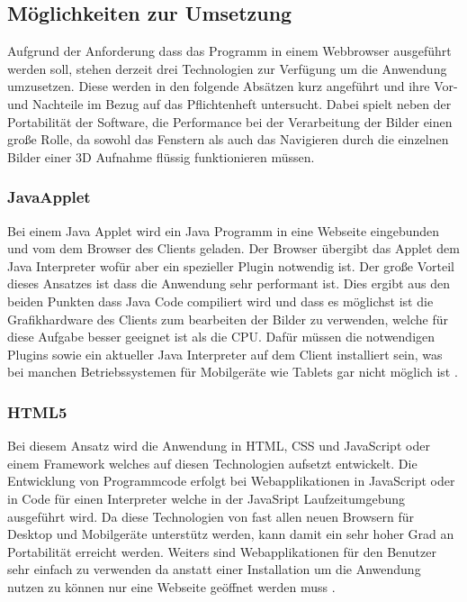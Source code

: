 \subsection{Möglichkeiten zur Umsetzung}
\label{sec:Möglichkeiten zur Umsetzung}
Aufgrund der Anforderung\R{,} dass\Rd{,} das Programm in einem Webbrowser ausgeführt werden soll, stehen derzeit drei Technologien zur Verfügung um die Anwendung umzusetzen.
Diese werden in den folgende Absätzen kurz angeführt und ihre Vor- und Nachteile im Bezug auf das Pflichtenheft untersucht.
Dabei spielt neben der Portabilität der Software, 
die Performance bei der Verarbeitung der Bilder einen große Rolle, da sowohl das Fenstern als auch das Navigieren durch die einzelnen Bilder einer 3D Aufnahme  flüssig funktionieren müssen.

\subsubsection{JavaApplet}
\label{sec:JavaApplet}
Bei einem Java Applet   wird ein Java Programm in eine Webseite eingebunden und vom dem Browser des Clients geladen.
Der Browser übergibt das Applet dem Java Interpreter wofür aber ein spezieller Plugin notwendig ist. 
%
Der große Vorteil dieses Ansatzes ist dass die Anwendung sehr performant ist.
Dies ergibt aus den beiden Punkten dass Java Code compiliert wird und dass es möglichst ist die Grafikhardware des Clients zum bearbeiten  der Bilder zu verwenden,
welche für diese Aufgabe besser geeignet ist als die CPU.
%
Dafür müssen die notwendigen Plugins sowie ein aktueller Java Interpreter auf dem Client installiert sein, 
was bei manchen Betriebssystemen für Mobilgeräte wie Tablets gar nicht möglich ist \cite{japp}.  

\subsubsection{HTML5}
\label{sec:HTML5}
Bei diesem Ansatz wird die Anwendung in HTML, CSS und JavaScript oder einem Framework welches auf diesen Technologien aufsetzt entwickelt.
Die Entwicklung von Programmcode erfolgt bei Webapplikationen in JavaScript oder in Code für einen Interpreter welche in der JavaSript Laufzeitumgebung ausgeführt wird.
Da diese Technologien von fast allen neuen Browsern für Desktop und Mobilgeräte unterstütz werden, kann damit ein sehr hoher Grad an Portabilität erreicht werden.
Weiters sind Webapplikationen für den Benutzer sehr einfach zu verwenden da anstatt einer Installation um die Anwendung nutzen zu können nur eine Webseite geöffnet werden muss \cite{html}.

